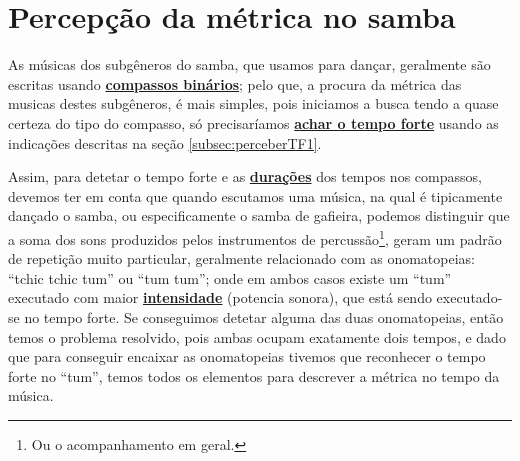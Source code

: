 \section{Percepção da métrica no samba}
\label{sec:percepcaosamba1}

As músicas dos subgêneros do samba, que usamos para dançar, 
geralmente são escritas usando \hyperref[subsec:compassobinario]{\textbf{compassos binários}};
pelo que, a procura da métrica das musicas destes subgêneros,
é mais simples, 
pois iniciamos a busca tendo a quase certeza do tipo do compasso, 
só precisaríamos \hyperref[subsec:perceberTF1]{\textbf{achar o tempo forte}} 
usando as indicações descritas na seção \ref{subsec:perceberTF1}.

Assim, para detetar o tempo forte e as \hyperref[sec:pos:Duracion]{\textbf{durações}} dos tempos nos compassos,
devemos ter em conta que quando escutamos uma música, 
na qual é tipicamente dançado o samba, ou especificamente o samba de gafieira,
podemos distinguir que a soma dos sons produzidos pelos instrumentos de percussão\footnote{Ou o
acompanhamento em geral.}, 
geram um padrão de repetição muito particular, 
geralmente relacionado com as onomatopeias: ``tchic tchic tum'' ou ``tum tum'';
onde em ambos  casos existe um  ``tum'' executado com maior 
\hyperref[sec:pos:Intensidade]{\textbf{intensidade}} (potencia sonora),
que está sendo executado-se no tempo forte.
Se conseguimos detetar alguma das duas onomatopeias,
então temos o problema resolvido, pois ambas ocupam exatamente dois tempos,
e dado que para conseguir encaixar as onomatopeias tivemos que reconhecer o tempo forte no ``tum'',
temos todos os elementos para descrever a métrica no tempo da música.


